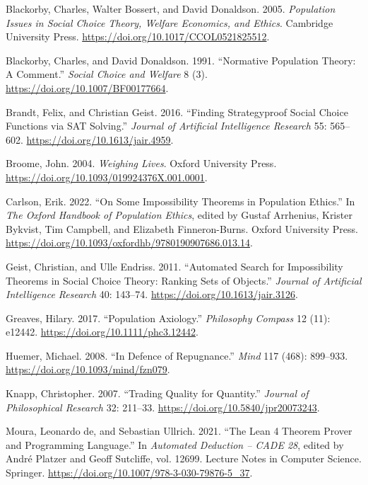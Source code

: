 \documentclass[
  11pt,
  letterpaper,
  DIV=11,
  numbers=noendperiod,
  twoside]{scrartcl}
\newlength{\cslhangindent}
\newenvironment{CSLReferences}[2] %
 {\begin{list}{}{%
  \setlength{\itemindent}{0pt}
  \setlength{\leftmargin}{0pt}
  \setlength{\parsep}{0pt}
  \ifodd #1
   \setlength{\leftmargin}{\cslhangindent}
   \setlength{\itemindent}{-1\cslhangindent}
  \fi
  \setlength{\itemsep}{#2\baselineskip}}}
 {\end{list}}
\begin{document}
\begin{CSLReferences}{1}{1}
Blackorby, Charles, Walter Bossert, and David Donaldson. 2005.
\emph{Population Issues in Social Choice Theory, Welfare Economics, and
Ethics}. Cambridge University Press.
\url{https://doi.org/10.1017/CCOL0521825512}.

Blackorby, Charles, and David Donaldson. 1991. {``Normative Population
Theory: A Comment.''} \emph{Social Choice and Welfare} 8 (3).
\url{https://doi.org/10.1007/BF00177664}.

Brandt, Felix, and Christian Geist. 2016. {``Finding Strategyproof
Social Choice Functions via {SAT} Solving.''} \emph{Journal of
Artificial Intelligence Research} 55: 565--602.
\url{https://doi.org/10.1613/jair.4959}.

Broome, John. 2004. \emph{Weighing Lives}. Oxford University Press.
\url{https://doi.org/10.1093/019924376X.001.0001}.

Carlson, Erik. 2022. {``On Some Impossibility Theorems in Population
Ethics.''} In \emph{The Oxford Handbook of Population Ethics}, edited by
Gustaf Arrhenius, Krister Bykvist, Tim Campbell, and Elizabeth
Finneron-Burns. Oxford University Press.
\url{https://doi.org/10.1093/oxfordhb/9780190907686.013.14}.

Geist, Christian, and Ulle Endriss. 2011. {``Automated Search for
Impossibility Theorems in Social Choice Theory: Ranking Sets of
Objects.''} \emph{Journal of Artificial Intelligence Research} 40:
143--74. \url{https://doi.org/10.1613/jair.3126}.

Greaves, Hilary. 2017. {``Population Axiology.''} \emph{Philosophy
Compass} 12 (11): e12442. \url{https://doi.org/10.1111/phc3.12442}.

Huemer, Michael. 2008. {``In Defence of Repugnance.''} \emph{Mind} 117
(468): 899--933. \url{https://doi.org/10.1093/mind/fzn079}.

Knapp, Christopher. 2007. {``Trading Quality for Quantity.''}
\emph{Journal of Philosophical Research} 32: 211--33.
\url{https://doi.org/10.5840/jpr20073243}.

Moura, Leonardo de, and Sebastian Ullrich. 2021. {``The {L}ean 4 Theorem
Prover and Programming Language.''} In \emph{Automated Deduction -- CADE
28}, edited by André Platzer and Geoff Sutcliffe, vol. 12699. Lecture
Notes in Computer Science. Springer.
\url{https://doi.org/10.1007/978-3-030-79876-5_37}.


\end{CSLReferences}
\end{document}
